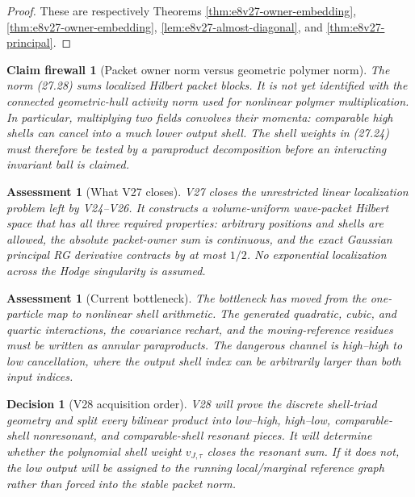 \documentclass[11pt,oneside]{book}
\newtheorem{assessment}[theorem]{Assessment}
\newtheorem{firewall}[theorem]{Claim firewall}
\newtheorem{decision}[theorem]{Decision}
\theoremstyle{definition}
\theoremstyle{remark}
\begin{document}
\begin{proof}
These are respectively Theorems
\ref{thm:e8v27-owner-embedding},
\ref{thm:e8v27-owner-embedding},
\ref{lem:e8v27-almost-diagonal}, and
\ref{thm:e8v27-principal}.
\end{proof}

\begin{firewall}[Packet owner norm versus geometric polymer norm]
\label{fire:e8v27-packet-polymer}
The norm (27.28) sums localized Hilbert packet blocks.  It is not yet
identified with the connected geometric-hull activity norm used for
nonlinear polymer multiplication.  In particular, multiplying two
fields convolves their momenta: comparable high shells can cancel
into a much lower output shell.  The shell weights in (27.24) must
therefore be tested by a paraproduct decomposition before an
interacting invariant ball is claimed.
\end{firewall}

\begin{assessment}[What V27 closes]
\label{ass:e8v27-closes}
V27 closes the unrestricted \emph{linear} localization problem left
by V24--V26.  It constructs a volume-uniform wave-packet Hilbert
space that has all three required properties: arbitrary positions
and shells are allowed, the absolute packet-owner sum is continuous,
and the exact Gaussian principal RG derivative contracts by at most
\(1/2\).  No exponential localization across the Hodge singularity
is assumed.
\end{assessment}

\begin{assessment}[Current bottleneck]
\label{ass:e8v27-remains}
The bottleneck has moved from the one-particle map to nonlinear shell
arithmetic.  The generated quadratic, cubic, and quartic interactions,
the covariance rechart, and the moving-reference residues must be
written as annular paraproducts.  The dangerous channel is
high--high to low cancellation, where the output shell index can be
arbitrarily larger than both input indices.
\end{assessment}

\begin{decision}[V28 acquisition order]
\label{dec:e8v27-v28}
V28 will prove the discrete shell-triad geometry and split every
bilinear product into low--high, high--low, comparable-shell
nonresonant, and comparable-shell resonant pieces.  It will determine
whether the polynomial shell weight \(v_{J,\tau}\) closes the
resonant sum.  If it does not, the low output will be assigned to the
running local/marginal reference graph rather than forced into the
stable packet norm.
\end{decision}
\end{document}
